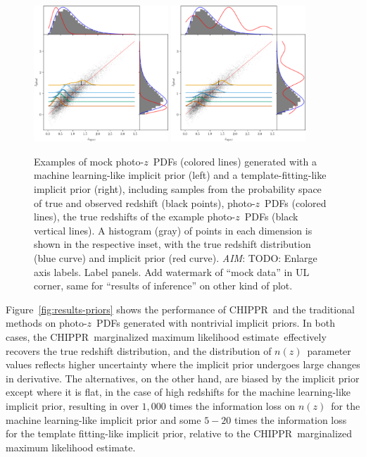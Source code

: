 \documentclass[iop]{emulateapj}
\newcommand{\todo}[3]{{\color{#2}\emph{#1}: #3}}
\newcommand{\aim}[1]{\todo{AIM}{red}{#1}}
\newcommand{\Fig}[1]{Figure~\ref{#1}}
\newcommand{\project}[1]{\textsc{#1}}
\newcommand{\Chippr}{\project{CHIPPR}}%
\newcommand{\pz}{photo-$z$}
\newcommand{\pzpdf}{\pz\ PDF}%
\newcommand{\nz}{$n(z)$}
\newcommand{\mmle}{marginalized maximum likelihood estimate}%
\begin{document}
\begin{figure}
	\begin{center}
	\includegraphics[width=0.45\textwidth]{figures/chippr/samplepzs_trpr.png}
	\includegraphics[width=0.45\textwidth]{figures/chippr/samplepzs_tmpr.png}
	\caption{
		Examples of mock \pzpdf s (colored lines) generated with a machine learning-like implicit prior (left) and a template-fitting-like implicit prior (right), including samples from the probability space of true and observed redshift (black points), \pzpdf s (colored lines), the true redshifts of the example \pzpdf s (black vertical lines).
		A histogram (gray) of points in each dimension is shown in the respective inset, with the true redshift distribution (blue curve) and implicit prior (red curve).
		\aim{TODO: Enlarge axis labels.
		Label panels.
		Add watermark of ``mock data'' in UL corner, same for ``results of inference'' on other kind of plot.}
	}
	\label{fig:pzs-priors}
	\end{center}
\end{figure}

\Fig{fig:results-priors} shows the performance of \Chippr\ and the traditional methods on \pzpdf s generated with nontrivial implicit priors.
In both cases, the \Chippr\ \mmle\ effectively recovers the true redshift distribution, and the distribution of \nz\ parameter values reflects higher uncertainty where the implicit prior undergoes large changes in derivative.
The alternatives, on the other hand, are biased by the implicit prior except where it is flat, in the case of high redshifts for the machine learning-like implicit prior, resulting in over $1,000$ times the information loss on \nz\ for the machine learning-like implicit prior and some $5-20$ times the information loss for the template fitting-like implicit prior, relative to the \Chippr\ \mmle.
\end{document}
